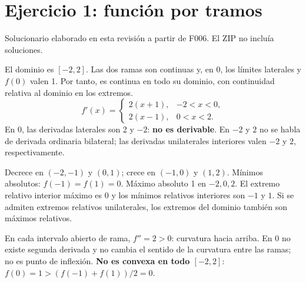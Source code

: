 \documentclass[11pt]{article}
\begin{document}
\section*{Ejercicio 1: función por tramos}
Solucionario elaborado en esta revisión a partir de F006. El ZIP no incluía soluciones.

El dominio es $[-2,2]$. Las dos ramas son continuas y, en $0$, los límites laterales y $f(0)$ valen 1. Por tanto, es continua en todo su dominio, con continuidad relativa al dominio en los extremos.
\[f'(x)=\begin{cases}2(x+1),&-2<x<0,\\2(x-1),&0<x<2.\end{cases}\]
En $0$, las derivadas laterales son 2 y $-2$: \textbf{no es derivable}. En $-2$ y $2$ no se habla de derivada ordinaria bilateral; las derivadas unilaterales interiores valen $-2$ y $2$, respectivamente.

Decrece en $(-2,-1)$ y $(0,1)$; crece en $(-1,0)$ y $(1,2)$. Mínimos absolutos: $f(-1)=f(1)=0$. Máximo absoluto 1 en $-2,0,2$. El extremo relativo interior máximo es $0$ y los mínimos relativos interiores son $-1$ y $1$. Si se admiten extremos relativos unilaterales, los extremos del dominio también son máximos relativos.

En cada intervalo abierto de rama, $f''=2>0$: curvatura hacia arriba. En $0$ no existe segunda derivada y no cambia el sentido de la curvatura entre las ramas; no es punto de inflexión. \textbf{No es convexa en todo $[-2,2]$}: $f(0)=1>(f(-1)+f(1))/2=0$.
\begin{center}\end{center}
\clearpage
\end{document}
